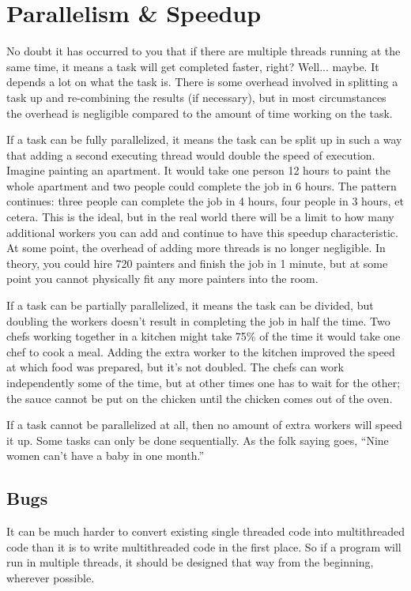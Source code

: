 \section*{Parallelism \& Speedup}
No doubt it has occurred to you that if there are multiple threads running at the same time, it means a task will get completed faster, right? Well... maybe. It depends a lot on what the task is. There is some overhead involved in splitting a task up and re-combining the results (if necessary), but in most circumstances the overhead is negligible compared to the amount of time working on the task.  

If a task can be fully parallelized, it means the task can be split up in such a way that adding a second executing thread would double the speed of execution. Imagine painting an apartment. It would take one person 12 hours to paint the whole apartment and two people could complete the job in 6 hours. The pattern continues: three people can complete the job in 4 hours, four people in 3 hours, et cetera. This is the ideal, but in the real world there will be a limit to how many additional workers you can add and continue to have this speedup characteristic. At some point, the overhead of adding more threads is no longer negligible. In theory, you could hire 720 painters and finish the job in 1 minute, but at some point you cannot physically fit any more painters into the room.

If a task can be partially parallelized, it means the task can be divided, but doubling the workers doesn't result in completing the job in half the time. Two chefs working together in a kitchen might take 75\% of the time it would take one chef to cook a meal. Adding the extra worker to the kitchen improved the speed at which food was prepared, but it's not doubled. The chefs can work independently some of the time, but at other times one has to wait for the other; the sauce cannot be put on the chicken until the chicken comes out of the oven.

If a task cannot be parallelized at all, then no amount of extra workers will speed it up. Some tasks can only be done sequentially. As the folk saying goes, ``Nine women can't have a baby in one month.''

\subsection*{Bugs}

It can be much harder to convert existing single threaded code into multithreaded code than it is to write multithreaded code in the first place. So if a program will run in multiple threads, it should be designed that way from the beginning, wherever possible.

